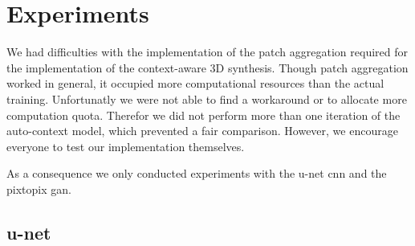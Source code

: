 \section{Experiments}

We had difficulties with the implementation of the patch aggregation required
for the implementation of the context-aware 3D synthesis. Though patch
aggregation worked in general, it occupied more computational resources than
the actual training. Unfortunatly we were not able to find a workaround or to
allocate more computation quota. Therefor we did not perform more than one
iteration of the auto-context model, which prevented a fair comparison.
However, we encourage everyone to test our implementation themselves.

As a consequence we only conducted experiments with the u-net \gls{cnn} and
the pixtopix \gls{gan}.

\subsection{u-net}

